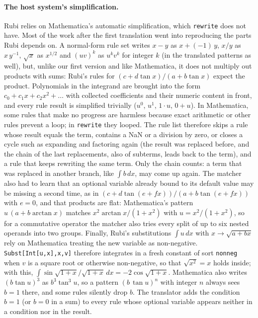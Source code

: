 \documentclass[11pt,a4paper]{article}
\begin{document}
\paragraph{The host system's simplification.} Rubi relies on Mathematica's
automatic simplification, which \texttt{rewrite} does not have. Most of the
work after the first translation went into reproducing the parts Rubi
depends on. A normal-form rule set writes $x-y$ as $x+(-1)\,y$, $x/y$ as
$x\,y^{-1}$, $\sqrt{x}$ as $x^{1/2}$ and $(uv)^k$ as $u^kv^k$ for integer
$k$ (in the translated patterns as well), but, unlike our first version and
like Mathematica, it does not multiply out products with sums: Rubi's rules
for $(c+d\tan x)/(a+b\tan x)$ expect the product. Polynomials in the
integrand are brought into the form $c_0+c_1x+c_2x^2+\dots$ with collected
coefficients and their numeric content in front, and every rule result is
simplified trivially ($u^0$, $u^1$, $1\cdot u$, $0+u$). In Mathematica,
some rules that make no progress are harmless because exact arithmetic or
other rules prevent a loop; in \texttt{rewrite} they looped. The rule list
therefore skips a rule whose result equals the term, contains a NaN or a
division by zero, or closes a cycle such as expanding and factoring again
(the result was replaced before, and the chain of the last replacements,
also of subterms, leads back to the term), and a rule that keeps rewriting
the same term. Only the chain counts: a term that was replaced in another
branch, like $\int b\,dx$, may come up again. The matcher also had to learn that an optional
variable already bound to its default value may be missing a second time,
as in $(c+d\tan(e+fx))/(a+b\tan(e+fx))$ with $e=0$, and that products are
flat: Mathematica's pattern $u\,(a+b\arctan x)$ matches
$x^2\arctan x/(1+x^2)$ with $u=x^2/(1+x^2)$, so for a commutative operator
the matcher also tries every split of up to six nested operands into two
groups. Finally, Rubi's
substitutions $\int u\,dx$ with $x\to\sqrt{a+bx}$ rely on Mathematica
treating the new variable as non-negative. \texttt{Subst[Int[u,x],x,v]}
therefore integrates in a fresh constant of sort \texttt{nonneg} when $v$ is
a square root or otherwise non-negative, so that $\sqrt{x^2}=x$ holds
inside; with this, $\int\sin\sqrt{1+x}/\sqrt{1+x}\,dx=-2\cos\sqrt{1+x}$.
Mathematica also writes $(b\tan u)^3$ as $b^3\tan^3u$, so a pattern
$(b\,\tan u)^n$ with integer $n$ always sees $b=1$ there, and some rules
silently drop $b$. The translator adds the condition $b=1$ (or $b=0$ in a
sum) to every rule whose optional variable appears neither in a condition
nor in the result.
\end{document}
